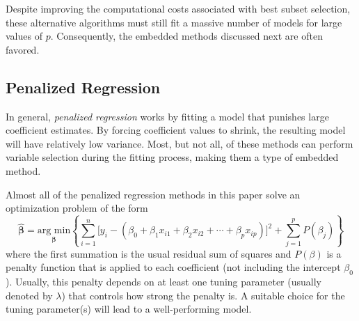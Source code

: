 \documentclass{article}
\newcommand{\argmin}[2]{\underset{#1}{\text{arg min}}\left\{#2\right\}}
\begin{document}
	Despite improving the computational costs associated with best subset selection, these alternative algorithms must still fit a massive number of models for large values of $p$. Consequently, the embedded methods discussed next are often favored. 
	
	\subsection{Penalized Regression}
	
	In general, \textit{penalized regression} works by fitting a model that punishes large coefficient estimates. By forcing coefficient values to shrink, the resulting model will have relatively low variance. Most, but not all, of these methods can perform variable selection during the fitting process, making them a type of embedded method.
	
	Almost all of the penalized regression methods in this paper solve an optimization problem of the form
	\begin{equation}\label{eqn:penalized-regression-lambda}
		\hat{\bm{\beta}}=\argmin{\bm{\beta}}{\sum\limits_{i = 1}^n \Big[y_i - (\beta_0 + \beta_1 x_{i1} + \beta_2 x_{i2} + \cdots + \beta_p x_{ip})\Big]^2 + \sum\limits_{j = 1}^p P(\beta_j)}
	\end{equation}
	where the first summation is the usual residual sum of squares and $P(\beta)$ is a penalty function that is applied to each coefficient (not including the intercept $\beta_0$). Usually, this penalty depends on at least one tuning parameter (usually denoted by $\lambda$) that controls how strong the penalty is. A suitable choice for the tuning parameter(s) will lead to a well-performing model.

	
\end{document}
